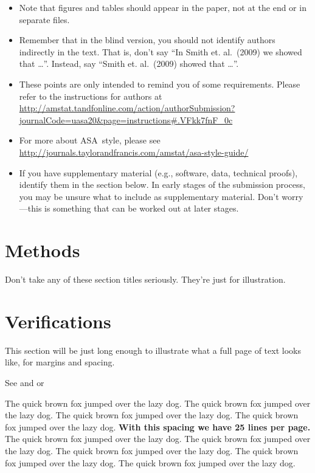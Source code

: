 \documentclass[12pt]{article}
\providecommand{\tightlist}{%
  \setlength{\itemsep}{0pt}\setlength{\parskip}{0pt}}
\begin{document}
\begin{itemize}
\tightlist
\item
  Note that figures and tables should appear in the paper, not at the
  end or in separate files.
\item
  Remember that in the blind version, you should not identify authors
  indirectly in the text. That is, don't say ``In Smith et. al.~(2009)
  we showed that \ldots{}''. Instead, say ``Smith et. al.~(2009) showed
  that \ldots{}''.
\item
  These points are only intended to remind you of some requirements.
  Please refer to the instructions for authors at
  \url{http://amstat.tandfonline.com/action/authorSubmission?journalCode=uasa20&page=instructions\#.VFkk7fnF_0c}
\item
  For more about ASA~style, please see
  \url{http://journals.taylorandfrancis.com/amstat/asa-style-guide/}
\item
  If you have supplementary material (e.g., software, data, technical
  proofs), identify them in the section below. In early stages of the
  submission process, you may be unsure what to include as supplementary
  material. Don't worry---this is something that can be worked out at
  later stages.
\end{itemize}

\section{Methods}\label{meth}

Don't take any of these section titles seriously. They're just for
illustration.

\section{Verifications}\label{verify}

This section will be just long enough to illustrate what a full page of
text looks like, for margins and spacing.

\addtolength{\textheight}{.5in}%

See \citet{Campbell02} and \citet{Schubert13} or \citep{Chi81}

The quick brown fox jumped over the lazy dog. The quick brown fox jumped
over the lazy dog. The quick brown fox jumped over the lazy dog. The
quick brown fox jumped over the lazy dog. \textbf{With this spacing we
have 25 lines per page.} The quick brown fox jumped over the lazy dog.
The quick brown fox jumped over the lazy dog. The quick brown fox jumped
over the lazy dog. The quick brown fox jumped over the lazy dog. The
quick brown fox jumped over the lazy dog.
\end{document}

